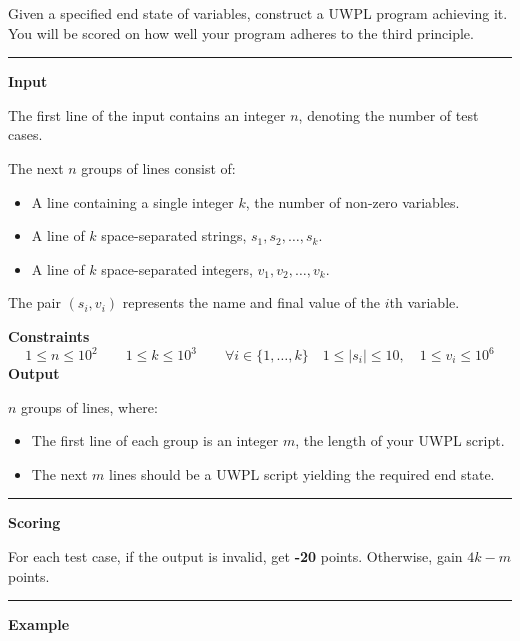 Given a specified end state of variables, construct a UWPL program achieving it. 
\\ You will be scored on how well your program adheres to the third principle.

\vspace{8pt}
\hrule

\textbf{Input}

The first line of the input contains an integer $n$, denoting the number of test cases.

The next $n$ groups of lines consist of:
\begin{itemize}
    \item A line containing a single integer $k$, the number of non-zero variables.
    \item A line of $k$ space-separated strings, $s_1, s_2, \dots, s_k$.
    \item A line of $k$ space-separated integers, $v_1, v_2, \dots, v_k$.
\end{itemize}

The pair $(s_i, v_i)$ represents the name and final value of the $i$th variable.

\textbf{Constraints}
\begin{equation*}
    1 \leq n \leq 10^2 \qquad
    1 \leq k \leq 10^3 \qquad
    \forall i \in \{1, \dots, k\} \quad 1 \leq |s_i| \leq 10, \quad 1 \leq v_i \leq 10^6
\end{equation*}
\textbf{Output}

$n$ groups of lines, where:
\begin{itemize}
    \item The first line of each group is an integer $m$, the length of your UWPL script.
    \item The next $m$ lines should be a UWPL script yielding the required end state.
\end{itemize}

\vspace{8pt}
\hrule

\textbf{Scoring}

For each test case, if the output is invalid, get \textbf{-20} points. Otherwise, gain $4k - m$ points.

\vspace{8pt}
\hrule

\newpage

\textbf{Example}

